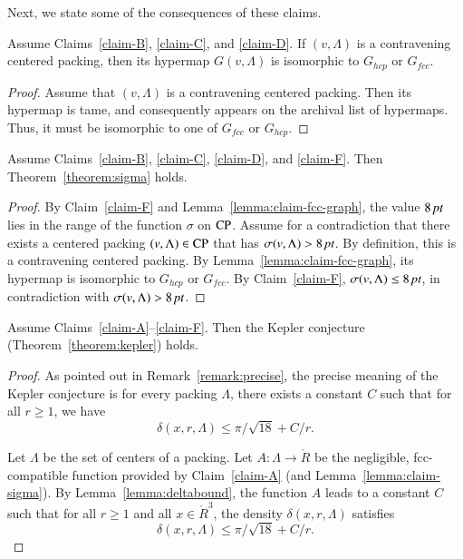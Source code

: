 Next, we state some of the consequences of these claims.

\begin{lemma}\label{lemma:claim-fcc-graph}
Assume Claims~\ref{claim-B}, \ref{claim-C}, and \ref{claim-D}. If
$(v,\Lambda)$ is a contravening centered packing, then its hypermap $G(v,\Lambda)$
is isomorphic to $G_{hcp}$ or $G_{fcc}$.
\end{lemma}

\begin{proof} Assume that $(v,\Lambda)$ is a contravening centered packing.  Then its hypermap is tame, and consequently appears on the
archival list of hypermaps.  Thus, it must be isomorphic to one of
$G_{fcc}$ or $G_{hcp}$.
\end{proof}

\begin{lemma}\label{lemma:claim-sigma}
Assume Claims~\ref{claim-B}, \ref{claim-C}, \ref{claim-D}, and
\ref{claim-F}. Then Theorem~\ref{theorem:sigma} holds.
\end{lemma}

\begin{proof}
By Claim~\ref{claim-F} and Lemma~\ref{lemma:claim-fcc-graph}, the
value $8\,\hbox{\it pt}$ lies in the range of the function $\sigma$ on
${\operatorname{CP}}$.   Assume for a contradiction that there exists a
centered packing $(v,\Lambda)\in {\operatorname{CP}}$ that has $\sigma(v,\Lambda)>8\,\hbox{\it pt}$. By
definition, this is a contravening centered packing. By
Lemma~\ref{lemma:claim-fcc-graph}, its hypermap is isomorphic to
$G_{hcp}$ or $G_{fcc}$.  By Claim~\ref{claim-F}, $\sigma(v,\Lambda)\le
8\,\hbox{\it pt}$, in contradiction with $\sigma(v,\Lambda)>8\,\hbox{\it pt}$.
\end{proof}


\begin{lemma}
Assume Claims~\ref{claim-A}--\ref{claim-F}. Then the Kepler
conjecture (Theorem~\ref{theorem:kepler}) holds.
\end{lemma}

\begin{proof} As pointed out in Remark~\ref{remark:precise}, the precise
meaning of the Kepler conjecture is for every %
packing
$\Lambda$, there exists a constant $C$ such that for all $r\ge 1$,
we have
    $$\delta(x,r,\Lambda)\le\pi/\sqrt{18} + C/r.$$

Let $\Lambda$ be the set of centers of a %
packing.  Let
$A:\Lambda \to \ring{R}$ be the negligible, fcc-compatible
function provided by Claim~\ref{claim-A} (and
Lemma~\ref{lemma:claim-sigma}). By Lemma~\ref{lemma:deltabound},
the function $A$ leads to a constant $C$ such that for all $r\ge
1$ and all $x\in \ring{R}^3$, the density $\delta(x,r,\Lambda)$
satisfies
   $$\delta(x,r,\Lambda) \le \pi/\sqrt{18} + C/r.$$
\end{proof}

